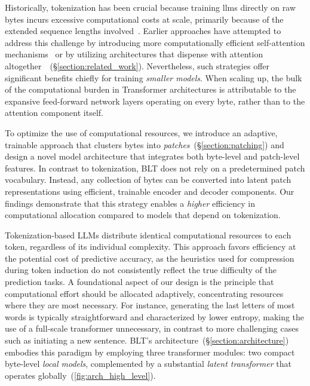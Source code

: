 Historically, tokenization has been crucial because training llms directly on raw bytes incurs excessive computational costs at scale, primarily because of the extended sequence lengths involved~\citep{xue2022byt5}. Earlier approaches have attempted to address this challenge by introducing more computationally efficient self-attention mechanisms~\citep{el2020characterbert, clark2022canine} or by utilizing architectures that dispense with attention altogether~\citep{wang2024mambabyte}~(\S\ref{section:related_work}). Nevertheless, such strategies offer significant benefits chiefly for training \textit{smaller models}. When scaling up, the bulk of the computational burden in Transformer architectures is attributable to the expansive feed-forward network layers operating on every byte, rather than to the attention component itself.

To optimize the use of computational resources, we introduce an adaptive, trainable approach that clusters bytes into \textit{patches}~(\S\ref{section:patching}) and design a novel model architecture that integrates both byte-level and patch-level features. In contrast to tokenization, {\textsc BLT} does not rely on a predetermined patch vocabulary. Instead, any collection of bytes can be converted into latent patch representations using efficient, trainable encoder and decoder components. Our findings demonstrate that this strategy enables a \textit{higher} efficiency in computational allocation compared to models that depend on tokenization.

Tokenization-based LLMs distribute identical computational resources to each token, regardless of its individual complexity. This approach favors efficiency at the potential cost of predictive accuracy, as the heuristics used for compression during token induction do not consistently reflect the true difficulty of the prediction tasks. A foundational aspect of our design is the principle that computational effort should be allocated adaptively, concentrating resources where they are most necessary. For instance, generating the last letters of most words is typically straightforward and characterized by lower entropy, making the use of a full-scale transformer unnecessary, in contrast to more challenging cases such as initiating a new sentence. {\textsc BLT}'s architecture~(\S\ref{section:architecture}) embodies this paradigm by employing three transformer modules: two compact byte-level \textit{local models}, complemented by a substantial \textit{latent transformer} that operates globally~(\autoref{fig:arch_high_level}).

